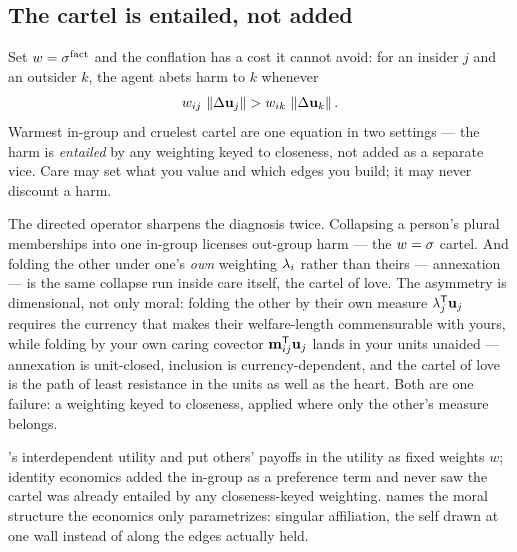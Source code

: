 \documentclass[../main]{subfiles}
\begin{document}
\subsection{The cartel is entailed, not added}
\label{subsec:hip:cartel}
%
Set $w=\sigma\sp{\mathrm{fact}}$ and the conflation has a cost it cannot avoid: for an insider
$j$ and an outsider $k$, the agent abets harm to $k$ whenever
\begin{equation}
  w\sb{ ij }\,\left\lVert \Delta\mathbf{u}\sb{j} \right\rVert>w\sb{ ik }\,\left\lVert \Delta\mathbf{u}\sb{k} \right\rVert.
  \label{eq:hip:cartel}
\end{equation}
Warmest in-group and cruelest cartel are one equation in two settings --- the harm is
\emph{entailed} by any weighting keyed to closeness, not added as a separate vice. Care may
set what you value and which edges you build; it may never discount a harm.

The directed operator sharpens the diagnosis twice. Collapsing a person's plural memberships
into one in-group licenses out-group harm --- the $w=\sigma$ cartel. And folding the other
under one's \emph{own} weighting $\lambda\sb{i}$ rather than theirs --- annexation
 --- is the same collapse run inside care itself, the cartel of love. The
asymmetry is dimensional, not only moral: folding the other by their own measure
$\lambda\sb{j}\sp{\mathsf{T}}\mathbf{u}\sb{j}$ requires the currency that makes their welfare-length commensurable
with yours, while folding by your own caring covector
$\mathbf{m}\sb{ ij }\sp{\mathsf{T}}\mathbf{u}\sb{j}$ lands in your units unaided ---
annexation is unit-closed, inclusion is currency-dependent, and the cartel of love is the
path of least resistance in the units as well as the heart. Both are one 
failure: a weighting keyed to closeness, applied where only the other's measure belongs.

\begin{econ}[label=e:cartel, title={Interdependent utility and the unseen cartel}, ref=J:hip,
  cites={a:beckerinterdep,a:fehrschmidt,a:akerlofkranton,a:senidentity}, departs=freeze,
  stopsat={the in-group as a fixed preference term, never seeing the cartel any closeness-keyed weighting already entails}]
  \textcite{a:beckerinterdep}'s interdependent utility and \textcite{a:fehrschmidt} put
  others' payoffs in the utility as fixed weights $w$; identity economics
  \parencite{a:akerlofkranton} added the in-group as a preference term and never saw the
  cartel was already entailed by any closeness-keyed weighting. \textcite{a:senidentity}
  names the moral structure the economics only parametrizes: singular affiliation, the self
  drawn at one wall instead of along the edges actually held.
\end{econ}
\end{document}
